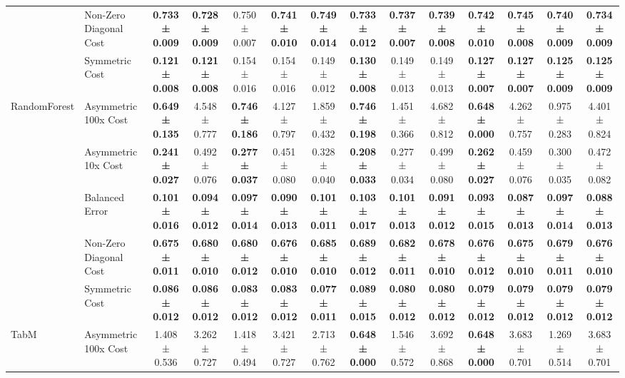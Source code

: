 \begin{table}[H]
{\begin{tabular}{llcccccccccccc}
 & Non-Zero Diagonal Cost & \textbf{0.733 ± 0.009} & \textbf{0.728 ± 0.009} & 0.750 ± 0.007 & \textbf{0.741 ± 0.010} & \textbf{0.749 ± 0.014} & \textbf{0.733 ± 0.012} & \textbf{0.737 ± 0.007} & \textbf{0.739 ± 0.008} & \textbf{0.742 ± 0.010} & \textbf{0.745 ± 0.008} & \textbf{0.740 ± 0.009} & \textbf{0.734 ± 0.009} \\
 & Symmetric Cost & \textbf{0.121 ± 0.008} & \textbf{0.121 ± 0.008} & 0.154 ± 0.016 & 0.154 ± 0.016 & 0.149 ± 0.012 & \textbf{0.130 ± 0.008} & 0.149 ± 0.013 & 0.149 ± 0.013 & \textbf{0.127 ± 0.007} & \textbf{0.127 ± 0.007} & \textbf{0.125 ± 0.009} & \textbf{0.125 ± 0.009} \\
\cline{1-14}
\multirow[t]{5}{*}{RandomForest} & Asymmetric 100x Cost & \textbf{0.649 ± 0.135} & 4.548 ± 0.777 & \textbf{0.746 ± 0.186} & 4.127 ± 0.797 & 1.859 ± 0.432 & \textbf{0.746 ± 0.198} & 1.451 ± 0.366 & 4.682 ± 0.812 & \textbf{0.648 ± 0.000} & 4.262 ± 0.757 & 0.975 ± 0.283 & 4.401 ± 0.824 \\
 & Asymmetric 10x Cost & \textbf{0.241 ± 0.027} & 0.492 ± 0.076 & \textbf{0.277 ± 0.037} & 0.451 ± 0.080 & 0.328 ± 0.040 & \textbf{0.208 ± 0.033} & 0.277 ± 0.034 & 0.499 ± 0.080 & \textbf{0.262 ± 0.027} & 0.459 ± 0.076 & 0.300 ± 0.035 & 0.472 ± 0.082 \\
 & Balanced Error & \textbf{0.101 ± 0.016} & \textbf{0.094 ± 0.012} & \textbf{0.097 ± 0.014} & \textbf{0.090 ± 0.013} & \textbf{0.101 ± 0.011} & \textbf{0.103 ± 0.017} & \textbf{0.101 ± 0.013} & \textbf{0.091 ± 0.012} & \textbf{0.093 ± 0.015} & \textbf{0.087 ± 0.013} & \textbf{0.097 ± 0.014} & \textbf{0.088 ± 0.013} \\
 & Non-Zero Diagonal Cost & \textbf{0.675 ± 0.011} & \textbf{0.680 ± 0.010} & \textbf{0.680 ± 0.012} & \textbf{0.676 ± 0.010} & \textbf{0.685 ± 0.010} & \textbf{0.689 ± 0.012} & \textbf{0.682 ± 0.011} & \textbf{0.678 ± 0.010} & \textbf{0.676 ± 0.012} & \textbf{0.675 ± 0.010} & \textbf{0.679 ± 0.011} & \textbf{0.676 ± 0.010} \\
 & Symmetric Cost & \textbf{0.086 ± 0.012} & \textbf{0.086 ± 0.012} & \textbf{0.083 ± 0.012} & \textbf{0.083 ± 0.012} & \textbf{0.077 ± 0.011} & \textbf{0.089 ± 0.015} & \textbf{0.080 ± 0.012} & \textbf{0.080 ± 0.012} & \textbf{0.079 ± 0.012} & \textbf{0.079 ± 0.012} & \textbf{0.079 ± 0.012} & \textbf{0.079 ± 0.012} \\
\cline{1-14}
\multirow[t]{5}{*}{TabM} & Asymmetric 100x Cost & 1.408 ± 0.536 & 3.262 ± 0.727 & 1.418 ± 0.494 & 3.421 ± 0.727 & 2.713 ± 0.762 & \textbf{0.648 ± 0.000} & 1.546 ± 0.572 & 3.692 ± 0.868 & \textbf{0.648 ± 0.000} & 3.683 ± 0.701 & 1.269 ± 0.514 & 3.683 ± 0.701 \\

\end{tabular}}
\end{table}
